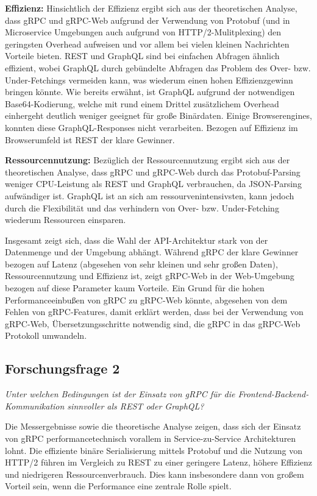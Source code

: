 \textbf{Effizienz:} 
Hinsichtlich der Effizienz ergibt sich aus der theoretischen Analyse, dass gRPC und gRPC-Web aufgrund der Verwendung von Protobuf (und in Microservice Umgebungen auch aufgrund von HTTP/2-Mulitplexing) den geringsten Overhead aufweisen und vor allem bei vielen kleinen Nachrichten Vorteile bieten. REST und GraphQL sind bei einfachen Abfragen ähnlich effizient, wobei GraphQL durch gebündelte Abfragen das Problem des Over- bzw. Under-Fetchings vermeiden kann, was wiederum einen hohen Effizienzgewinn bringen könnte. Wie bereits erwähnt, ist GraphQL aufgrund der notwendigen Base64-Kodierung, welche  mit rund einem Drittel zusätzlichem Overhead einhergeht deutlich weniger geeignet für große Binärdaten. Einige Browserengines, konnten diese GraphQL-Responses nicht verarbeiten. Bezogen auf Effizienz im Browserumfeld ist REST der klare Gewinner.

\textbf{Ressourcennutzung:} 
Bezüglich der Ressourcennutzung ergibt sich aus der theoretischen Analyse, dass gRPC und gRPC-Web durch das Protobuf-Parsing weniger CPU-Leistung als REST und GraphQL verbrauchen, da JSON-Parsing aufwändiger ist. GraphQL ist an sich am ressourvenintensivsten, kann jedoch durch die Flexibilität und das verhindern von Over- bzw. Under-Fetching wiederum Ressourcen einsparen.

Insgesamt zeigt sich, dass die Wahl der API-Architektur stark von der Datenmenge und der Umgebung abhängt. Während gRPC der klare Gewinner bezogen auf Latenz (abgesehen von sehr kleinen und sehr großen Daten), Ressourcennutzung und Effizienz ist, zeigt gRPC-Web in der Web-Umgebung bezogen auf diese Parameter kaum Vorteile. Ein Grund für die hohen Performanceeinbußen von gRPC zu gRPC-Web könnte, abgesehen von dem Fehlen von gRPC-Features, damit erklärt werden, dass bei der Verwendung von gRPC-Web, Übersetzungsschritte notwendig sind, die gRPC in das gRPC-Web Protokoll umwandeln.

\subsection*{Forschungsfrage 2}
\textit{Unter welchen Bedingungen ist der Einsatz von gRPC für die Frontend-Backend-Kommunikation sinnvoller als REST oder GraphQL?}

Die Messergebnisse sowie die theoretische Analyse zeigen, dass sich der Einsatz von gRPC performancetechnisch vorallem in Service-zu-Service Architekturen lohnt. Die effiziente binäre Serialisierung mittels Protobuf und die Nutzung von HTTP/2  führen im Vergleich zu REST zu einer geringere Latenz, höhere Effizienz und niedrigeren Ressourcenverbrauch. Dies kann insbesondere dann von großem Vorteil sein, wenn die Performance eine zentrale Rolle spielt.

